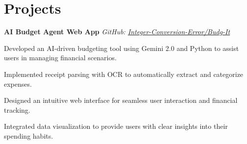 \documentclass[11pt]{article}
\begin{document}
\section*{Projects}
\begin{small}


\noindent\textbf{AI Budget Agent Web App} \hfill \textit{GitHub: \href{https://github.com/Integer-Conversion-Error/Budg-It}{Integer-Conversion-Error/Budg-It}}
\begin{compactitem}
    \item Developed an AI-driven budgeting tool using Gemini 2.0 and Python to assist users in managing financial scenarios.
    \item Implemented receipt parsing with OCR to automatically extract and categorize expenses.
    \item Designed an intuitive web interface for seamless user interaction and financial tracking.
    \item Integrated data visualization to provide users with clear insights into their spending habits.
\end{compactitem}


\end{small}
\end{document}
